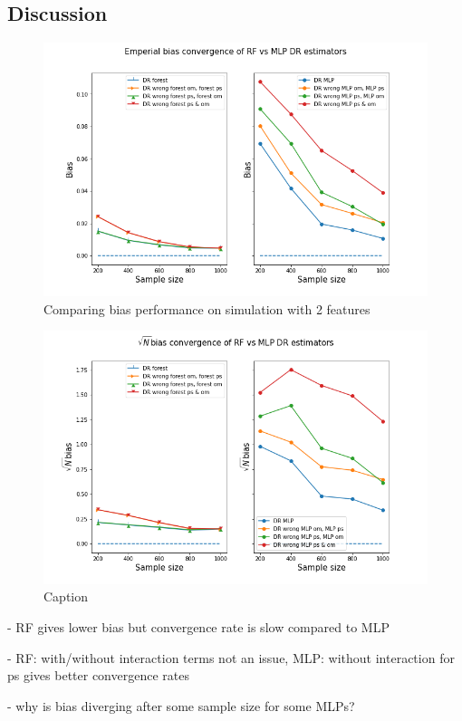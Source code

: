 \documentclass[12pt,twoside]{article}
\begin{document}
\subsection{Discussion}
\begin{figure}[h!]
    \centering
    \includegraphics[width = 0.8\columnwidth]{figures/biascompare.png}
    \caption{Comparing bias performance on simulation with 2 features}
    \label{fig:my_label}
\end{figure}

\begin{figure}[h!]
    \centering
    \includegraphics[width = 0.8\columnwidth]{figures/sqrtncompare.png}
    \caption{Caption}
    \label{fig:my_label}
\end{figure}


- RF gives lower bias but convergence rate is slow compared to MLP 

- RF: with/without interaction terms not an issue, MLP: without interaction for ps gives better convergence rates 

- why is bias diverging after some sample size for some MLPs?
\end{document}
